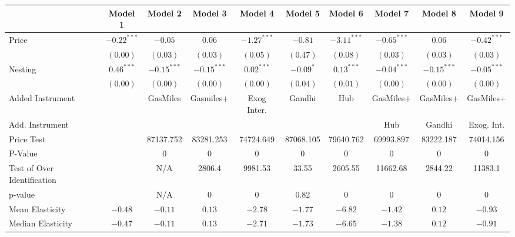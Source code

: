 
\begin{tabular}{l c c c c c c c c c}
\toprule
 & Model 1 & Model 2 & Model 3 & Model 4 & Model 5 & Model 6 & Model 7 & Model 8 & Model 9 \\
\midrule
Price                       & $-0.22^{***}$ & $-0.05$       & $0.06$        & $-1.27^{***}$ & $-0.81$     & $-3.11^{***}$ & $-0.65^{***}$ & $0.06$        & $-0.42^{***}$ \\
                            & $(0.00)$      & $(0.03)$      & $(0.03)$      & $(0.05)$      & $(0.47)$    & $(0.08)$      & $(0.03)$      & $(0.03)$      & $(0.03)$      \\
Nesting                     & $0.46^{***}$  & $-0.15^{***}$ & $-0.15^{***}$ & $0.02^{***}$  & $-0.09^{*}$ & $0.13^{***}$  & $-0.04^{***}$ & $-0.15^{***}$ & $-0.05^{***}$ \\
                            & $(0.00)$      & $(0.00)$      & $(0.00)$      & $(0.00)$      & $(0.04)$    & $(0.01)$      & $(0.00)$      & $(0.00)$      & $(0.00)$      \\
\midrule
Added Instrument            &               & GasMiles      & Gasmiles+     & Exog Inter.   & Gandhi      & Hub           & GasMiles+     & GasMiles+     & GasMiles+     \\
Add. Instrument             &               &               &               &               &             &               & Hub           & Gandhi        & Exog. Int.    \\
Price Test                  &               & 87137.752     & 83281.253     & 74724.649     & 87068.105   & 79640.762     & 69993.897     & 83222.187     & 74014.156     \\
P-Value                     &               & 0             & 0             & 0             & 0           & 0             & 0             & 0             & 0             \\
Test of Over Identification &               & N/A           & 2806.4        & 9981.53       & 33.55       & 2605.55       & 11662.68      & 2844.22       & 11383.1       \\
p-value                     &               & N/A           & 0             & 0             & 0.82        & 0             & 0             & 0             & 0             \\
Mean Elasticity             & $-0.48$       & $-0.11$       & $0.13$        & $-2.78$       & $-1.77$     & $-6.82$       & $-1.42$       & $0.12$        & $-0.93$       \\
Median Elasticity           & $-0.47$       & $-0.11$       & $0.13$        & $-2.71$       & $-1.73$     & $-6.65$       & $-1.38$       & $0.12$        & $-0.91$       \\

\end{tabular}
